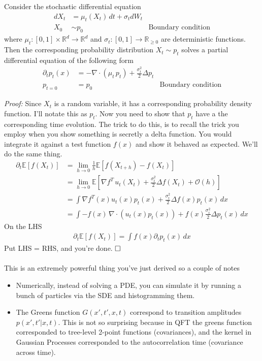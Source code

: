 \begin{theorem}
	Consider the stochastic differential equation
	\begin{align}
		dX_t & = \mu_t(X_t) \, dt + \sigma_t dW_t\\
		X_0 & \sim p_0 & \text{Boundary condition}
	\end{align}
	where $\mu_t : [0,1] \times \mathbb R^d \to \mathbb R^d$ and $\sigma_t : [0,1] \to \mathbb R_{\geq 0}$ are deterministic functions. Then the corresponding probability distribution $X_t \sim p_t$ solves a partial differential equation of the following form
	\begin{align}
		\partial_t p_t(x) & = - \nabla \cdot (\mu_t\, p_t) + \frac{\sigma_t^2}{2} \Delta p_t\\
		p_{t=0} & = p_0 & \text{Boundary condition}
	\end{align}
\end{theorem}
\emph{Proof:}  Since $X_t$ is a random variable, it has a corresponding probability density function. I'll notate this as $p_t$. Now you need to show that $p_t$ have a the corresponding time evolution. The trick to do this, is to recall the trick you employ when you show something is secretly a delta function. You would integrate it against a test function $f(x)$ and show it behaved as expected. We'll do the same thing.
\begin{align}
	\partial_t \mathbb E[f(X_t)] & = \lim_{h \to 0} \frac{1}{h} \mathbb E[f(X_{t+h}) - f(X_t)] \\
	& = \lim_{h \to 0} \mathbb E[\nabla f^T\, u_t(X_t) + \frac{\sigma^2_t}{2} \Delta f(X_t) + \mathcal O(h)]\\
	& = \int \nabla f^T (x) u_t(x) p_t(x) +  \frac{\sigma^2_t}{2} \Delta f(x)  p_t(x) \, dx\\
	& = \int -f(x) \, \nabla \cdot (u_t(x) p_t(x)) + f(x) \frac{\sigma^2_t}{2} \Delta p_t(x)\, dx
\end{align}
On the LHS
\begin{align}
	\partial_t \mathbb E[f(X_t)] = \int f(x) \partial_t p_t(x) \, dx
\end{align}
Put LHS = RHS, and you're done. $\hfill \Box$
\\
\\
This is an extremely powerful thing you've just derived so a couple of notes
\begin{itemize}
	\item Numerically, instead of solving a PDE, you can simulate it by running a bunch of particles via the SDE and histogramming them. 
	\item The Greens function $G(x',t',x,t)$ correspond to transition amplitudes $p(x', t' | x, t)$. This is not so surprising because in QFT the greens function corresponded to tree-level 2-point functions (covariances), and the kernel in Gaussian Processes corresponded to the autocorrelation time (covariance across time). 
\end{itemize}


